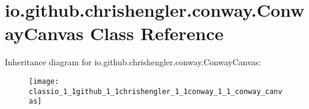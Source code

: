 \hypertarget{classio_1_1github_1_1chrishengler_1_1conway_1_1_conway_canvas}{}\section{io.\+github.\+chrishengler.\+conway.\+Conway\+Canvas Class Reference}
\label{classio_1_1github_1_1chrishengler_1_1conway_1_1_conway_canvas}
Inheritance diagram for io.\+github.\+chrishengler.\+conway.\+Conway\+Canvas\+:\begin{figure}[H]
\begin{center}
\leavevmode
\texttt{[image: classio\_1\_1github\_1\_1chrishengler\_1\_1conway\_1\_1\_conway\_canvas]}
\end{center}
\end{figure}

